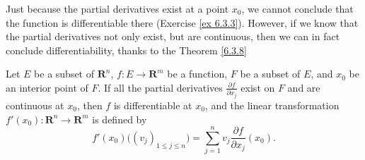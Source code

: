 \begin{note}
    Just because the partial derivatives exist at a point \(x_0\), we cannot conclude that the function is differentiable there (Exercise \ref{ex 6.3.3}).
    However, if we know that the partial derivatives not only exist, but are continuous, then we can in fact conclude differentiability, thanks to the Theorem \ref{6.3.8}
\end{note}

\begin{theorem}\label{6.3.8}
    Let \(E\) be a subset of \(\mathbf{R}^n\), \(f : E \to \mathbf{R}^m\) be a function, \(F\) be a subset of \(E\), and \(x_0\) be an interior point of \(F\).
    If all the partial derivatives \(\frac{\partial f}{\partial x_j}\) exist on \(F\) and are continuous at \(x_0\), then \(f\) is differentiable at \(x_0\), and the linear transformation \(f'(x_0) : \mathbf{R}^n \to \mathbf{R}^m\) is defined by
    \[
        f'(x_0)\big((v_j)_{1 \leq j \leq n}\big) = \sum_{j = 1}^n v_j \frac{\partial f}{\partial x_j}(x_0).
    \]
\end{theorem}

